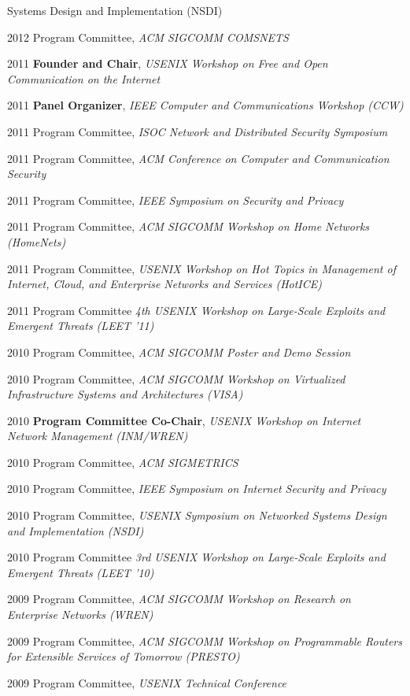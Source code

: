 \begin{cvlist}{}
{  Systems Design and Implementation (NSDI)}
\item[2012] Program Committee, {\em ACM SIGCOMM COMSNETS}
\item[2011] {\bf Founder and Chair}, {\em USENIX Workshop on Free and
  Open Communication on the Internet}
\item[2011] {\bf Panel Organizer}, {\em IEEE Computer and Communications
  Workshop (CCW)} 
\item[2011] Program Committee, {\em ISOC Network and Distributed
  Security Symposium}
\item[2011] Program Committee, {\em ACM Conference on Computer and
  Communication Security}
\item[2011] Program Committee, {\em IEEE Symposium on Security and Privacy}
\item[2011] Program Committee, {\em ACM SIGCOMM Workshop on Home
  Networks (HomeNets)}
\item[2011] Program Committee, {\em USENIX Workshop on Hot Topics in
  Management of Internet, Cloud, and Enterprise Networks and Services
  (HotICE)} 
\item[2011] Program Committee {\em 4th USENIX Workshop on Large-Scale
  Exploits and Emergent Threats (LEET '11)}\nw
\item[2010] Program Committee, {\em ACM SIGCOMM Poster and Demo Session}
\item[2010] Program Committee, {\em ACM SIGCOMM Workshop on Virtualized
  Infrastructure Systems and Architectures (VISA)}
\item[2010] {\bf Program Committee Co-Chair}, {\em USENIX Workshop on Internet
  Network Management (INM/WREN)}\nw
\item[2010] Program Committee, {\em ACM SIGMETRICS}\nw
\item[2010] Program Committee, {\em IEEE Symposium on Internet Security
  and Privacy}\nw
\item[2010] Program Committee, {\em USENIX Symposium on Networked
  Systems Design and Implementation (NSDI)}\nw
\item[2010] Program Committee {\em 3rd USENIX Workshop on Large-Scale
  Exploits and Emergent Threats (LEET '10)}\nw
\item[2009] Program Committee, {\em ACM SIGCOMM Workshop on Research on
  Enterprise Networks (WREN)}\nw
\item[2009] Program Committee, {\em ACM SIGCOMM Workshop on Programmable
  Routers for Extensible Services of Tomorrow (PRESTO)}\nw
\item[2009] Program Committee, {\em USENIX Technical Conference} \nw

\end{cvlist}
